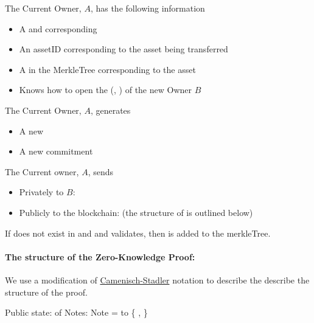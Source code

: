 The Current Owner, $A$, has the following information
	\begin{itemize}
    \item A  and corresponding 
    \item An assetID corresponding to the asset being transferred
    \item A  in the MerkleTree corresponding to the asset
    \item Knows how to open the  (, )  of the new Owner $B$
	\end{itemize}

The Current Owner, $A$, generates
	\begin{itemize}
    \item A new 
    \item A new commitment 
	\end{itemize}

The Current owner, $A$, sends
	\begin{itemize}
    \item Privately to $B$: 
    \item Publicly to the blockchain:  (the structure of  is outlined below)
	\end{itemize}

If  does not exist in  and and  validates, then  is added to the merkleTree.


\paragraph{The structure of the Zero-Knowledge Proof:}

We use a modification of \href{https://www.research-collection.ethz.ch/bitstream/handle/20.500.11850/69316/eth-3353-01.pdf}{Camenisch-Stadler} notation to describe the describe the structure of the proof.

Public state:  of Notes:
Note =  to \{ ,  \}

